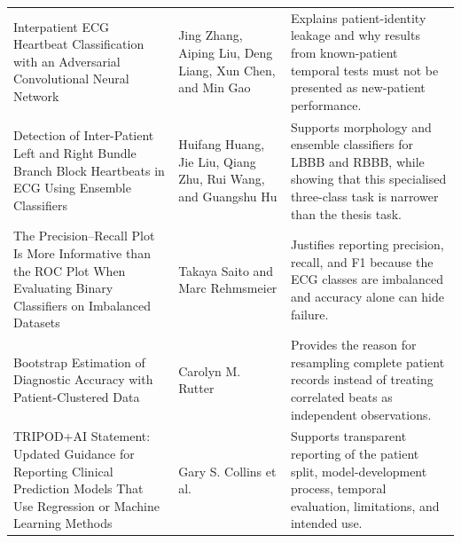 \begin{longtable}{>{\raggedright\arraybackslash}p{5.0cm}>{\raggedright\arraybackslash}p{3.4cm}>{\raggedright\arraybackslash}p{5.3cm}}
Interpatient ECG Heartbeat Classification with an Adversarial Convolutional Neural Network \cite{zhang2021interpatient} & Jing Zhang, Aiping Liu, Deng Liang, Xun Chen, and Min Gao & Explains patient-identity leakage and why results from known-patient temporal tests must not be presented as new-patient performance.\\
Detection of Inter-Patient Left and Right Bundle Branch Block Heartbeats in ECG Using Ensemble Classifiers \cite{huang2014bbb} & Huifang Huang, Jie Liu, Qiang Zhu, Rui Wang, and Guangshu Hu & Supports morphology and ensemble classifiers for LBBB and RBBB, while showing that this specialised three-class task is narrower than the thesis task.\\
The Precision--Recall Plot Is More Informative than the ROC Plot When Evaluating Binary Classifiers on Imbalanced Datasets \cite{saito2015pr} & Takaya Saito and Marc Rehmsmeier & Justifies reporting precision, recall, and F1 because the ECG classes are imbalanced and accuracy alone can hide failure.\\
Bootstrap Estimation of Diagnostic Accuracy with Patient-Clustered Data \cite{rutter2000clustered} & Carolyn M. Rutter & Provides the reason for resampling complete patient records instead of treating correlated beats as independent observations.\\
TRIPOD+AI Statement: Updated Guidance for Reporting Clinical Prediction Models That Use Regression or Machine Learning Methods \cite{collins2024tripodai} & Gary S. Collins et al. & Supports transparent reporting of the patient split, model-development process, temporal evaluation, limitations, and intended use.\\
\bottomrule
\end{longtable}
\endgroup
